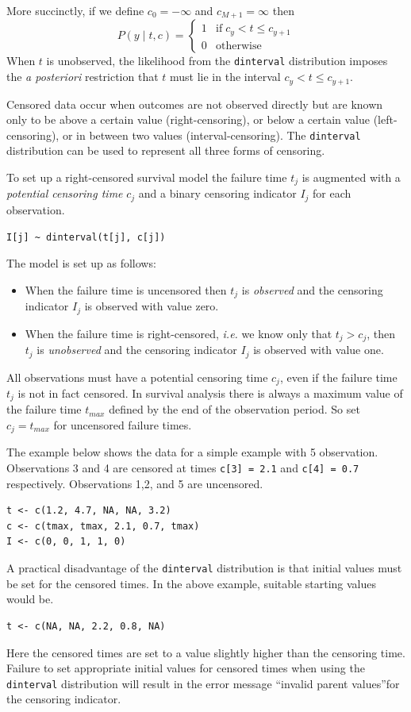 \documentclass[11pt, a4paper, titlepage]{report}
\begin{document}
More succinctly, if we define $c_0 = -\infty$ and $c_{M+1} = \infty$ then
\[
P(y \mid t, c) = \left\{
\begin{array}{cl}
  1 & \mbox{if} \; c_{y} < t \leq c_{y+1} \\
  0 & \mbox{otherwise}
\end{array}
\right.
\]
When $t$ is unobserved, the likelihood from the \texttt{dinterval}
distribution imposes the {\em a posteriori} restriction that $t$ must
lie in the interval $c_{y} < t \leq c_{y+1}$.

Censored data occur when outcomes are not observed directly but are
known only to be above a certain value (right-censoring), or below a
certain value (left-censoring), or in between two values
(interval-censoring). The \texttt{dinterval} distribution can be used
to represent all three forms of censoring.

To set up a right-censored survival model the failure time $t_j$ is
augmented with a {\em potential censoring time} $c_j$ and a binary
censoring indicator $I_j$ for each observation.
\begin{verbatim}
I[j] ~ dinterval(t[j], c[j])
\end{verbatim}
The model is set up as follows:
\begin{itemize}
\item When the failure time is uncensored then $t_j$ is {\em observed}
  and the censoring indicator $I_j$ is observed with value zero.
\item When the failure time is right-censored, {\em i.e.} we know only
  that $t_j > c_j$, then $t_j$ is {\em unobserved} and the censoring
  indicator $I_j$ is observed with value one.
\end{itemize}
All observations must have a potential censoring time $c_j$, even if
the failure time $t_j$ is not in fact censored.  In survival analysis
there is always a maximum value of the failure time $t_{max}$ defined
by the end of the observation period. So set $c_j = t_{max}$ for
uncensored failure times.

The example below shows the data for a simple example with 5 observation.
Observations 3 and 4 are censored at times \verb+c[3] = 2.1+ and
\verb+c[4] = 0.7+ respectively. Observations 1,2, and 5 are uncensored.
\begin{verbatim}
t <- c(1.2, 4.7, NA, NA, 3.2)
c <- c(tmax, tmax, 2.1, 0.7, tmax)
I <- c(0, 0, 1, 1, 0)
\end{verbatim}
A practical disadvantage of the \texttt{dinterval} distribution is that
initial values must be set for the censored times. In the above example,
suitable starting values would be. %
\begin{verbatim}
t <- c(NA, NA, 2.2, 0.8, NA)
\end{verbatim}
Here the censored times are set to a value slightly higher than the
censoring time. Failure to set appropriate initial values for censored
times when using the \texttt{dinterval} distribution will result in
the error message ``invalid parent values''for the censoring
indicator.
\end{document}
